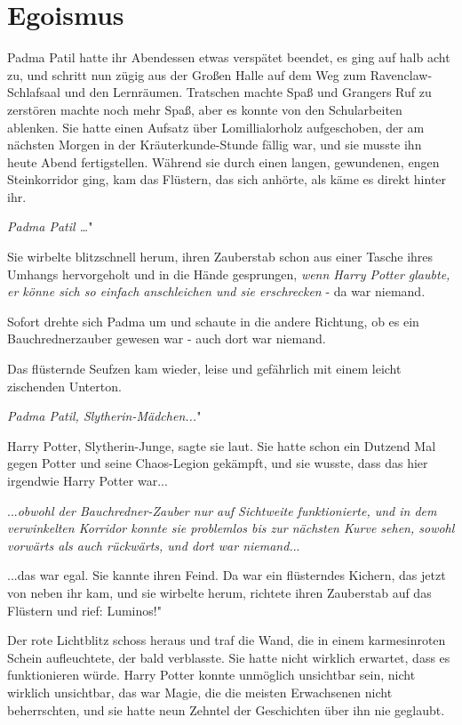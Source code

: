\chapter{Egoismus}

Padma Patil hatte ihr Abendessen etwas verspätet beendet, es ging auf halb acht
zu, und schritt nun zügig aus der Großen Halle auf dem Weg zum
Ravenclaw-Schlafsaal und den Lernräumen. Tratschen machte Spaß und Grangers Ruf
zu zerstören machte noch mehr Spaß, aber es konnte von den Schularbeiten
ablenken. Sie hatte einen Aufsatz über Lomillialorholz aufgeschoben, der am
nächsten Morgen in der Kräuterkunde-Stunde fällig war, und sie musste ihn heute
Abend fertigstellen. Während sie durch einen langen, gewundenen, engen
Steinkorridor ging, kam das Flüstern, das sich anhörte, als käme es direkt
hinter ihr.

\glqq{}\emph{Padma Patil …}"

Sie wirbelte blitzschnell herum, ihren Zauberstab schon aus einer Tasche ihres
Umhangs hervorgeholt und in die Hände gesprungen,\emph{ wenn Harry Potter
glaubte, er könne sich so einfach anschleichen und sie erschrecken} - da war
niemand.

Sofort drehte sich Padma um und schaute in die andere Richtung, ob es ein
Bauchrednerzauber gewesen war - auch dort war niemand.

Das flüsternde Seufzen kam wieder, leise und gefährlich mit einem leicht
zischenden Unterton.

\glqq{}\emph{Padma Patil, Slytherin-Mädchen...}"

\glqq{}Harry Potter, Slytherin-Junge\grqq{}, sagte sie laut. Sie hatte schon ein
Dutzend Mal gegen Potter und seine Chaos-Legion gekämpft, und sie wusste, dass
das hier irgendwie Harry Potter war...

...\emph{obwohl der Bauchredner-Zauber nur auf Sichtweite funktionierte, und in
dem verwinkelten Korridor konnte sie problemlos bis zur nächsten Kurve sehen,
sowohl vorwärts als auch rückwärts, und dort war niemand.}..

...das war egal. Sie kannte ihren Feind. Da war ein flüsterndes Kichern, das
jetzt von neben ihr kam, und sie wirbelte herum, richtete ihren Zauberstab auf
das Flüstern und rief: \glqq{}Luminos!"

Der rote Lichtblitz schoss heraus und traf die Wand, die in einem karmesinroten
Schein aufleuchtete, der bald verblasste. Sie hatte nicht wirklich erwartet,
dass es funktionieren würde. Harry Potter konnte unmöglich unsichtbar sein,
nicht wirklich unsichtbar, das war Magie, die die meisten Erwachsenen nicht
beherrschten, und sie hatte neun Zehntel der Geschichten über ihn nie geglaubt.

